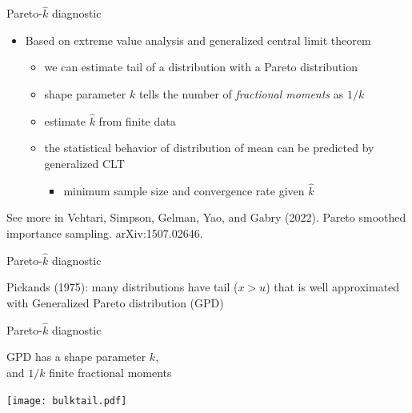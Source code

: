 \documentclass[finnish,english,t]{beamer}
\begin{document}
\begin{frame}{Pareto-$\hat{k}$ diagnostic}

  \begin{itemize}
  \item Based on extreme value analysis and generalized central limit theorem
    \begin{itemize}
    \item<2-> we can estimate tail of a distribution with a Pareto distribution
    \item<3-> shape parameter $k$ tells the number of \textit{fractional moments} as $1/k$
    \item<3-> estimate $\hat{k}$ from finite data
    \item<4-> the statistical behavior of distribution of mean can be
      predicted by generalized CLT
      \begin{itemize}
      \item minimum sample size and convergence rate given $\hat{k}$
      \end{itemize}
    \end{itemize}
  \end{itemize}

  \vspace{5\baselineskip}
  {\small
  See more in Vehtari, Simpson, Gelman, Yao, and Gabry (2022). Pareto
  smoothed importance sampling. arXiv:1507.02646.}
  
\end{frame}

\begin{frame}{Pareto-$\hat{k}$ diagnostic}

   Pickands (1975): many distributions have tail ($x > u$) that
    is well approximated with Generalized Pareto distribution (GPD)

    {
      \vspace{-0.5\baselineskip}
}

\end{frame}

\begin{frame}{Pareto-$\hat{k}$ diagnostic}

 GPD has a shape parameter $k$,\\and $1/k$ finite fractional
    moments

    {
      \vspace{-0.5\baselineskip}
  \texttt{[image: bulktail.pdf]}
}

\end{frame}
\end{document}

